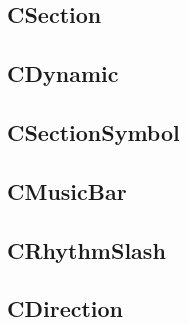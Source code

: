 \documentclass[a4paper]{article}
\begin{document}
\subsection{CSection}
\subsection{CDynamic}
\subsection{CSectionSymbol}
\subsection{CMusicBar}
\subsection{CRhythmSlash}
\subsection{CDirection}
\end{document}
